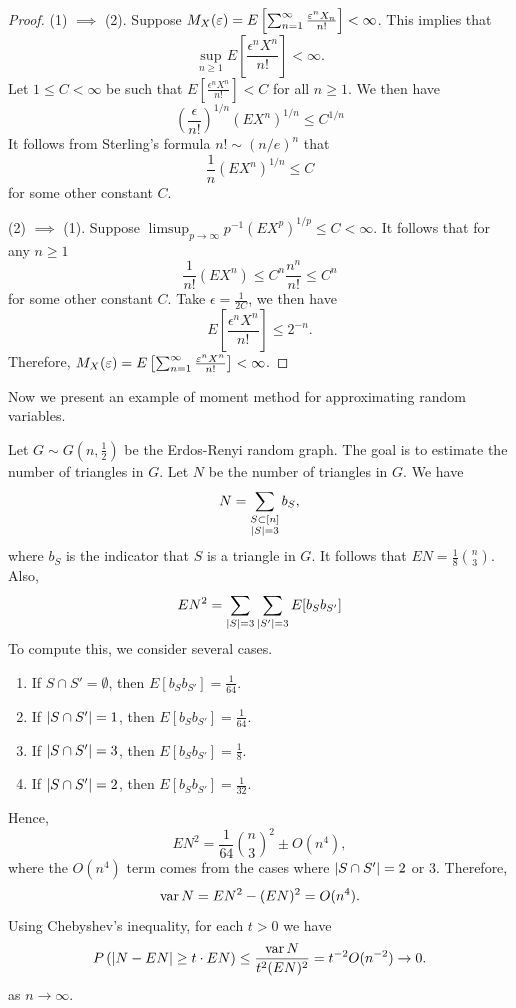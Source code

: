\documentclass[a4paper]{article}
\begin{document}
\begin{proof}
  (1) $\implies$ (2). Suppose $M_X (\varepsilon) = E \left[ \sum_{n=1}^\infty \frac{\varepsilon^n 
  X_n}{n!} \right] < \infty$. This implies that
  \[
  \sup_{n \geq 1} E \left[ \frac{\epsilon^n X^n}{n!} \right] < \infty.
  \]
  Let $1 \leq C < \infty$ be such that $E \left[ \frac{\epsilon^n X^n}{n!} \right] < C$
  for all $n \geq 1$. We then have 
  \[
  \left( \frac{\epsilon}{n!} \right)^{1 / n} \left( E X^n  \right)^{1 / n}
  \leq C^{1 / n}
  \] 
  It follows from Sterling's formula $n! \sim \left( n / e \right)^n$
  that 
  \[
  \frac{1}{n} \left( E X^n \right)^{1 / n} \leq C
  \]
  for some other constant $C$.

  (2) $\implies$ (1). Suppose $\limsup_{p \to \infty} p^{-1} \left( E X^p \right)
  ^{1 / p} \leq C < \infty$. It follows that for any $n \geq 1$
  \[
  \frac{1}{n!} \left( E X^n \right) \leq C^n \frac{n^n}{n!} \leq C^n
  \]
  for some other constant $C$.
  Take $\epsilon = \frac{1}{2 C}$, we then have 
  \[
  E \left[ \frac{\epsilon^n X^n}{n!} \right] \leq 2^{-n}.
  \]
  Therefore, $M_X (\varepsilon) 
  = E \left[ \sum_{n=1}^\infty \frac{\varepsilon^n X^n}{n!} \right] < \infty$.

\end{proof}

Now we present an example of moment method for approximating random 
variables.
\begin{eg}
  Let $G \sim G(n, \frac{1}{2})$ be the Erdos-Renyi random graph. The goal 
  is to estimate the number of triangles in $G$. Let $N$ be 
  the number of triangles in $G$. We have 
  \[
  N = \sum_{\substack{S \subset [n] \\ \left\lvert S\right\rvert = 3}} b_S,
  \]
  where $b_S$ is the indicator that $S$ is a triangle in $G$.
  It follows that $E N = \frac{1}{8} \binom{n}{3}$. Also, 
  \[
  E N^2 = \sum_{\left\lvert S\right\rvert = 3} \sum_{\left\lvert S'\right\rvert = 3} E [b_S b_{S'}]
  \]
  To compute this, we consider several cases. 
  \begin{enumerate}
    \item If $S \cap S' = \emptyset$, then $E [b_S b_{S'}] = \frac{1}{64}$.
    \item If $\left\lvert S \cap S'\right\rvert = 1$, then $E [b_S b_{S'}] = \frac{1}{64}$.
    \item If $\left\lvert S \cap S'\right\rvert = 3$, then $E [b_S b_{S'}] = \frac{1}{8}$.
    \item If $\left\lvert S \cap S'\right\rvert = 2$, then $E [b_S b_{S'}] = \frac{1}{32}$.
  \end{enumerate}
  Hence, 
  \[
  E N^2 = \frac{1}{64} \binom{n}{3}^2 \pm O(n^4),
  \]
  where the $O(n^4)$ term comes from the cases where $\left\lvert S \cap S'\right\rvert = 2$
  or $3$. Therefore, 
  \[
  \operatorname{var} N = E N^2 - (E N)^2 = O(n^4).
  \]
  Using Chebyshev's inequality, for each $t > 0$ we have
  \[
  P \left( \left\lvert N - E N\right\rvert \geq t \cdot E N \right)
  \leq \frac{\operatorname{var} N}{t^2 (E N)^2} = t^{-2} O(n^{-2})
  \to 0.
  \]
  as $n \to \infty$.

\end{eg}
\end{document}
